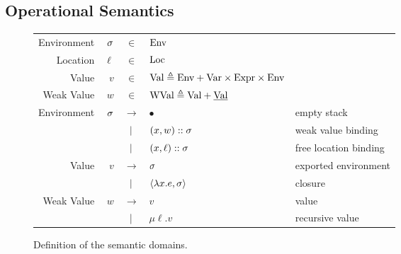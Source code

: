 \documentclass{article}
\begin{document}
\subsection{Operational Semantics}
\begin{figure}[h!]
	\centering
	\small
	\begin{tabular}{rrcll}
		Environment & $\sigma$ & $\in$         & $\text{Env}$                                                                        \\
		Location    & $\ell$ & $\in$         & $\text{Loc}$                                                                        \\
		Value       & $v$    & $\in$         & $\text{Val} \triangleq\text{Env}+\text{Var}\times\text{Expr}\times\text{Env}$                         \\
		Weak Value  & $w$    & $\in$         & $\text{WVal}\triangleq\text{Val}+\underline{\text{Val}}$                                     \\
		Environment & $\sigma$ & $\rightarrow$ & $\bullet$                                             & empty stack           \\
		            &        & $|$       & $(x,w):: \sigma$                                     & weak value binding    \\
		            &        & $|$       & $(x,\ell)::\sigma$                                   & free location binding \\
		Value       & $v$    & $\rightarrow$ & $\sigma$                                                & exported environment  \\
		            &        & $|$       & $\langle \lambda x.e, \sigma \rangle$                   & closure               \\
		Weak Value  & $w$    & $\rightarrow$ & $v$                                                   & value                 \\
		            &        & $|$       & $\mu\ell.v$                                           & recursive value
	\end{tabular}
	\caption{Definition of the semantic domains.}
	\label{fig:domain}
\end{figure}
\end{document}

